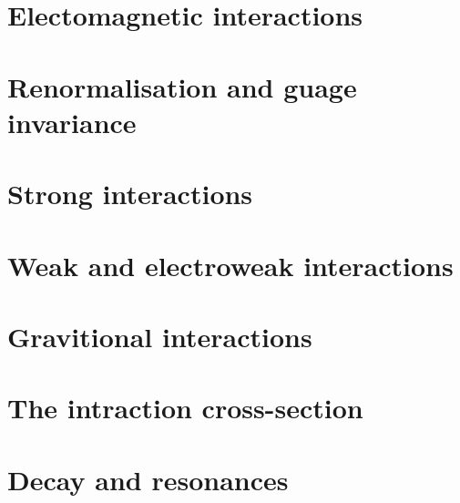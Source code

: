 \documentclass{book}
\begin{document}
\section{Electomagnetic interactions}
\section{Renormalisation and guage invariance}
\section{Strong interactions}
\section{Weak and electroweak interactions}
\section{Gravitional interactions}
\section{The intraction cross-section}
\section{Decay and resonances}
\end{document}

